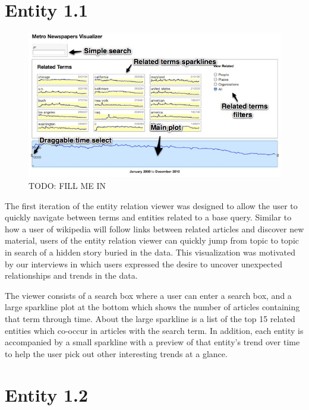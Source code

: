 \section{Entity 1.1}

\begin{figure}[htb]
  \centerline{
    \includegraphics[scale=0.28]{figures/relation-0.jpg}
  }
  \caption{TODO: FILL ME IN}
  \label{fig:explorer-0}
\end{figure}

The first iteration of the entity relation viewer was designed to allow the user to quickly navigate between terms and entities related to a base query. Similar to how a user of wikipedia will follow links between related articles and discover new material, users of the entity relation viewer can quickly jump from topic to topic in search of a hidden story buried in the data. This visualization was motivated by our interviews in which users expressed the desire to uncover unexpected relationships and trends in the data.

The viewer consists of a search box where a user can enter a search box, and a large sparkline plot at the bottom which shows the number of articles containing that term through time. About the large sparkline is a list of the top 15 related entities which co-occur in articles with the search term. In addition, each entity is accompanied by a small sparkline with a preview of that entity's trend over time to help the user pick out other interesting trends at a glance.

\section{Entity 1.2}


